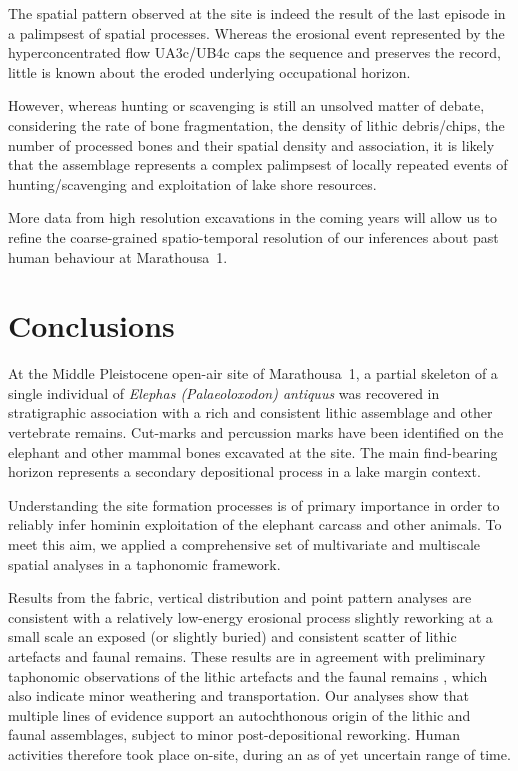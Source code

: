 \documentclass[preprint,authoryear,times]{elsarticle} %
\begin{document}
The spatial pattern observed at the site is indeed the result of the last episode in a palimpsest of spatial processes. Whereas the erosional event represented by the hyperconcentrated flow UA3c/UB4c caps the sequence and preserves the record, little is known about the eroded underlying occupational horizon.

However, whereas hunting or scavenging is still an unsolved matter of debate, considering the rate of bone fragmentation, the density of lithic debris/chips, the number of processed bones and their spatial density and association, it is likely that the assemblage represents a complex palimpsest of locally repeated events of hunting/scavenging and exploitation of lake shore resources. %

More data from high resolution excavations in the coming years will allow us to refine the coarse-grained spatio-temporal resolution of our inferences about past human behaviour at Marathousa~1.

\section{Conclusions}

At the Middle Pleistocene open-air site of Marathousa~1, a partial skeleton of a single individual of \emph{Elephas (Palaeoloxodon) antiquus} was recovered in stratigraphic association with a rich and consistent lithic assemblage and other vertebrate remains. Cut-marks and percussion marks have been identified on the elephant and other mammal bones excavated at the site. The main find-bearing horizon represents a secondary depositional process in a lake margin context.

Understanding the site formation processes is of primary importance in order to reliably infer hominin exploitation of the elephant carcass and other animals. To meet this aim, we applied a comprehensive set of multivariate and multiscale spatial analyses in a taphonomic framework.

Results from the fabric, vertical distribution and point pattern analyses are consistent with a relatively low-energy erosional process slightly reworking at a small scale an exposed (or slightly buried) and consistent scatter of lithic artefacts and faunal remains. These results are in agreement with preliminary taphonomic observations of the lithic artefacts \citep{Tourloukis} and the faunal remains \citep{Konidaris}, which also indicate minor weathering and transportation. Our analyses show that multiple lines of evidence support an autochthonous origin of the lithic and faunal assemblages, subject to minor post-depositional reworking. Human activities therefore took place on-site, during an as of yet uncertain range of time.
\end{document}
